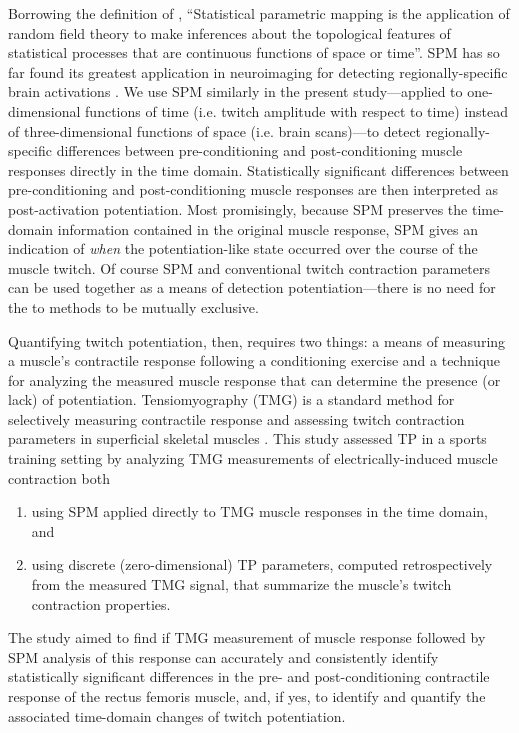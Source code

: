 \documentclass[utf8]{FrontiersinHarvard}
\begin{document}
Borrowing the definition of \cite{flandin},
``Statistical parametric mapping is the application of random field theory to make inferences about the topological features of statistical processes that are continuous functions of space or time''.
SPM has so far found its greatest application in neuroimaging for detecting regionally-specific brain activations \citep{friston}.
We use SPM similarly in the present study---applied to one-dimensional functions of time (i.e. twitch amplitude with respect to time) instead of three-dimensional functions of space (i.e. brain scans)---to detect regionally-specific differences between pre-conditioning and post-conditioning muscle responses directly in the time domain.
Statistically significant differences between pre-conditioning and post-conditioning muscle responses are then interpreted as post-activation potentiation.
Most promisingly, because SPM preserves the time-domain information contained in the original muscle response, SPM gives an indication of \textit{when} the potentiation-like state occurred over the course of the muscle twitch.
Of course SPM and conventional twitch contraction parameters can be used together as a means of detection potentiation---there is no need for the to methods to be mutually exclusive.

Quantifying twitch potentiation, then, requires two things: a means of measuring a muscle's contractile response following a conditioning exercise and a technique for analyzing the measured muscle response that can determine the presence (or lack) of potentiation.
Tensiomyography (TMG) is a standard method for selectively measuring contractile response and assessing twitch contraction parameters in superficial skeletal muscles \citep{valencic, dahmane-fiber, dahmane-measurement, meglic, simunic, martin-rodriguez, ce}.
This study assessed TP in a sports training setting by analyzing TMG measurements of electrically-induced muscle contraction both
\begin{enumerate}

    \item using SPM applied directly to TMG muscle responses in the time domain, and

    \item using discrete (zero-dimensional) TP parameters, computed retrospectively from the measured TMG signal, that summarize the muscle's twitch contraction properties.

\end{enumerate}
The study aimed to find if TMG measurement of muscle response followed by SPM analysis of this response can accurately and consistently identify statistically significant differences in the pre- and post-conditioning contractile response of the rectus femoris muscle, and,
if yes, to identify and quantify the associated time-domain changes of twitch potentiation.
\end{document}
